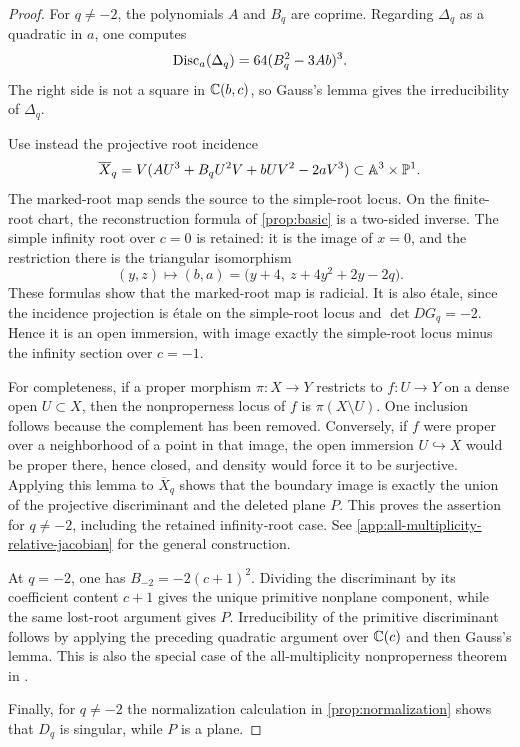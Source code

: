 \documentclass[11pt,reqno]{amsart}
\begin{document}
\begin{proof}
For \(q\ne-2\), the polynomials \(A\) and \(B_q\) are coprime.  Regarding
\(\Delta_q\) as a quadratic in \(a\), one computes
\[
\operatorname{Disc}_a(\Delta_q)=64(B_q^2-3Ab)^3.
\]
The right side is not a square in \(\mathbb C(b,c)\), so Gauss's lemma gives the
irreducibility of \(\Delta_q\).

Use instead the projective root incidence
\[
\overline X_q=
V(AU^3+B_qU^2V+bUV^2-2aV^3)
\subset\mathbb A^3\times\mathbb P^1.
\]
The marked-root map sends the source to the simple-root locus.  On the
finite-root chart, the reconstruction formula of
\cref{prop:basic} is a two-sided inverse.  The simple infinity
root over \(c=0\) is retained: it is the image of \(x=0\), and the
restriction there is the triangular isomorphism
\[
(y,z)\longmapsto (b,a)
=\bigl(y+4,\ z+4y^2+2y-2q\bigr).
\]
These formulas
show that the marked-root map is radicial.  It is also étale, since the
incidence projection is étale on the simple-root locus and
\(\det DG_q=-2\).  Hence it is an open immersion, with image exactly the
simple-root locus minus the infinity section over \(c=-1\).

For completeness, if a proper morphism \(\pi:X\to Y\) restricts to
\(f:U\to Y\) on a dense open \(U\subset X\), then the nonproperness locus of
\(f\) is \(\pi(X\setminus U)\).  One inclusion follows because the
complement has been removed.  Conversely, if \(f\) were proper over a
neighborhood of a point in that image, the open immersion
\(U\hookrightarrow X\) would be proper there, hence closed, and density
would force it to be surjective.  Applying this lemma to
\(\overline X_q\) shows that the boundary image is exactly the union of the
projective discriminant and the deleted plane \(P\).  This proves the
assertion for \(q\ne-2\), including the retained infinity-root case.  See
\cref{app:all-multiplicity-relative-jacobian} for the general construction.

At \(q=-2\), one has \(B_{-2}=-2(c+1)^2\).  Dividing the discriminant by
its coefficient content \(c+1\) gives the unique primitive nonplane
component, while the same lost-root argument gives \(P\).  Irreducibility of
the primitive discriminant follows by applying the preceding quadratic
argument over \(\mathbb C(c)\) and then Gauss's lemma.  This is also the special
case of the all-multiplicity nonproperness theorem in
\cite{monson2026markedroot}.

Finally, for \(q\ne-2\) the normalization calculation in
\cref{prop:normalization} shows that \(D_q\) is singular, while \(P\) is a
plane.
\end{proof}
\end{document}
